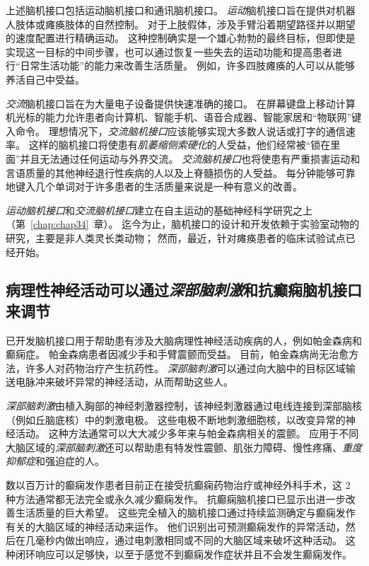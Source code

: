 上述脑机接口包括运动脑机接口和通讯脑机接口。
\textit{运动}脑机接口旨在提供对机器人肢体或瘫痪肢体的自然控制。
对于上肢假体，涉及手臂沿着期望路径并以期望的速度配置进行精确运动。
这种控制确实是一个雄心勃勃的最终目标，但即使是实现这一目标的中间步骤，也可以通过恢复一些失去的运动功能和提高患者进行“日常生活功能”的能力来改善生活质量。
例如，许多四肢瘫痪的人可以从能够养活自己中受益。


\textit{交流}脑机接口旨在为大量电子设备提供快速准确的接口。
在屏幕键盘上移动计算机光标的能力允许患者向计算机、智能手机、语音合成器、智能家居和“物联网”键入命令。 
理想情况下，\textit{交流脑机接口}应该能够实现大多数人说话或打字的通信速率。
这样的脑机接口将使患有\textit{肌萎缩侧索硬化}的人受益，他们经常被“锁在里面”并且无法通过任何运动与外界交流。
\textit{交流脑机接口}也将使患有严重损害运动和言语质量的其他神经退行性疾病的人以及上脊髓损伤的人受益。
每分钟能够可靠地键入几个单词对于许多患者的生活质量来说是一种有意义的改善。


\textit{运动脑机接口}和\textit{交流脑机接口}建立在自主运动的基础神经科学研究之上（第~\ref{chap:chap34}~章）。 
迄今为止，脑机接口的设计和开发依赖于实验室动物的研究，主要是非人类灵长类动物；
然而，最近，针对瘫痪患者的临床试验试点已经开始。



\subsection{病理性神经活动可以通过\textit{深部脑刺激}和抗癫痫脑机接口来调节}

已开发脑机接口用于帮助患有涉及大脑病理性神经活动疾病的人，例如帕金森病和癫痫症。
帕金森病患者因减少手和手臂震颤而受益。
目前，帕金森病尚无治愈方法，许多人对药物治疗产生抗药性。
\textit{深部脑刺激}可以通过向大脑中的目标区域输送电脉冲来破坏异常的神经活动，从而帮助这些人。


\textit{深部脑刺激}由植入胸部的神经刺激器控制，该神经刺激器通过电线连接到深部脑核（例如丘脑底核）中的刺激电极。
这些电极不断地刺激细胞核，以改变异常的神经活动。 
这种方法通常可以大大减少多年来与帕金森病相关的震颤。
应用于不同大脑区域的\textit{深部脑刺激}还可以帮助患有特发性震颤、肌张力障碍、慢性疼痛、\textit{重度抑郁症}和强迫症的人。


数以百万计的癫痫发作患者目前正在接受抗癫痫药物治疗或神经外科手术，这 2 种方法通常都无法完全或永久减少癫痫发作。
抗癫痫脑机接口已显示出进一步改善生活质量的巨大希望。
这些完全植入的脑机接口通过持续监测确定与癫痫发作有关的大脑区域的神经活动来运作。 
他们识别出可预测癫痫发作的异常活动，然后在几毫秒内做出响应，通过电刺激相同或不同的大脑区域来破坏这种活动。 
这种闭环响应可以足够快，以至于感觉不到癫痫发作症状并且不会发生癫痫发作。



